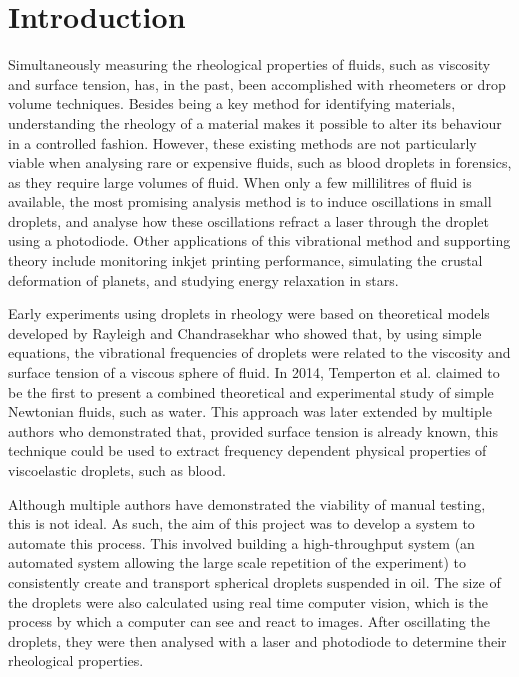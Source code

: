 \documentclass{physics_article_B}
\begin{document}
\newpage
\tableofcontents

\setlength{\parskip}{8pt}  
\newpage
{} 
\setcounter{page}{1}

\section{Introduction\label{sect:intro}}

    Simultaneously measuring the rheological properties of fluids, such as viscosity and surface tension, has, in the past, been accomplished with rheometers\cite{harrold2} or drop volume techniques\cite{miller1992}. Besides being a key method for identifying materials, understanding the rheology of a material makes it possible to alter its behaviour in a controlled fashion. However, these existing methods are not particularly viable when analysing rare or expensive fluids, such as blood droplets in forensics, as they require large volumes of fluid. When only a few millilitres of fluid is available, the most promising analysis method is to induce oscillations in small droplets\cite{harrold}, and analyse how these oscillations refract a laser through the droplet using a photodiode. Other applications of this vibrational method and supporting theory include monitoring inkjet printing performance\cite{Martin2008}, simulating the crustal deformation of planets\cite{vukasinovic}, and studying energy relaxation in stars\cite{vukasinovic}.
    
    Early experiments using droplets in rheology were based on theoretical models developed by Rayleigh\cite{rayleigh} and Chandrasekhar\cite{chandrasekhar2} who showed that, by using simple equations, the vibrational frequencies of droplets were related to the viscosity and surface tension of a viscous sphere of fluid. In 2014, Temperton et al. claimed to be the first to present a combined theoretical and experimental study of simple Newtonian fluids, such as water\cite{temperton}. This approach was later extended by multiple authors who demonstrated that, provided surface tension is already known, this technique could be used to extract frequency dependent physical properties of viscoelastic droplets, such as blood\cite{egry}. 
    
    Although multiple authors have demonstrated the viability of manual testing\cite{benmore,Meier2000,Egry1998}, this is not ideal. As such, the aim of this project was to develop a system to automate this process. This involved building a high-throughput system (an automated system allowing the large scale repetition of the experiment) to consistently create and transport spherical droplets suspended in oil. The size of the droplets were also calculated using real time computer vision, which is the process by which a computer can see and react to images. After oscillating the droplets, they were then analysed with a laser and photodiode to determine their rheological properties.
    
\end{document}
